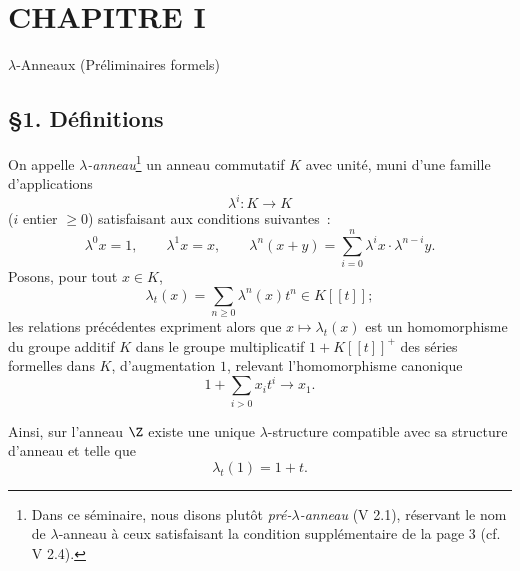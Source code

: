 \section*{CHAPITRE I}
\begin{center}
$\lambda$-Anneaux (Préliminaires formels)
\end{center}

\subsection*{\S 1. Définitions}

On appelle \emph{$\lambda$-anneau}\footnote{Dans ce séminaire, nous disons plutôt \emph{pré-$\lambda$-anneau} (V 2.1), réservant le nom de $\lambda$-anneau à ceux satisfaisant la condition supplémentaire de la page 3 (cf. V 2.4).} un anneau commutatif $K$ avec unité, muni d'une famille d'applications
\begin{equation}\tag{1.1}
\lambda^i:K\longrightarrow K
\end{equation}
($i$ entier $\geq 0$) satisfaisant aux conditions suivantes~:
\begin{equation}\tag{1.2}
\lambda^0x=1,\qquad \lambda^1x=x,\qquad
\lambda^n(x+y)=\sum_{i=0}^n\lambda^ix\cdot\lambda^{n-i}y.
\end{equation}
Posons, pour tout $x\in K$,
\begin{equation}\tag{1.3}
\lambda_t(x)=\sum_{n\geq 0}\lambda^n(x)t^n\in K[[t]] ;
\end{equation}
les relations précédentes expriment alors que $x\longmapsto\lambda_t(x)$ est un homomorphisme du groupe additif $K$ dans le groupe multiplicatif $1+K[[t]]^+$ des séries formelles dans $K$, d'augmentation $1$, relevant l'homomorphisme canonique
\[
1+\sum_{i>0}x_it^i\longrightarrow x_1.
\]

Ainsi, sur l'anneau $\Z$ existe une unique $\lambda$-structure compatible avec sa structure d'anneau et telle que
\begin{equation}\tag{1.4}
\lambda_t(1)=1+t.
\end{equation}
